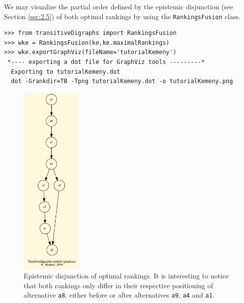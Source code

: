 We may visualize the partial order defined by the epistemic disjunction (see Section \ref{sec:2.5}) of both optimal \Kemeny rankings by using the \texttt{RankingsFusion} class.
\begin{lstlisting}[caption={Computing the epistemic disjunction of all optimal \Kemeny rankings},label=list:8.9]   
>>> from transitiveDigraphs import RankingsFusion
>>> wke = RankingsFusion(ke,ke.maximalRankings)
>>> wke.exportGraphViz(fileName='tutorialKemeny')
 *---- exporting a dot file for GraphViz tools ---------*
  Exporting to tutorialKemeny.dot
  dot -Grankdir=TB -Tpng tutorialKemeny.dot -o tutorialKemeny.png
\end{lstlisting}
\begin{figure}[h]
\sidecaption[t]
\includegraphics[width=3cm]{Figures/tutorialKemeny.png}
\caption{Epistemic disjunction of optimal \Kemeny rankings. It is interesting to notice that both \Kemeny rankings only differ in their respective positioning of alternative \texttt{a8}; either before or after alternatives \texttt{a9}, \texttt{a4} and \texttt{a1}. }
\label{fig:8.3}       %
\end{figure}

